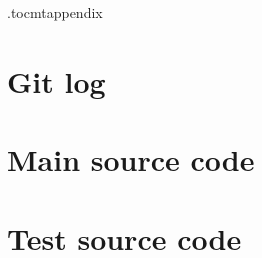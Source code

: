 \documentclass[a4paper,12pt]{article}
\begin{document}
\newpage
\appendix

\etocdepthtag.toc{mtappendix}
\tableofcontents‎‎

\newpage

\section{Git log}



\section{Main source code}



\section{Test source code}


\end{document}
